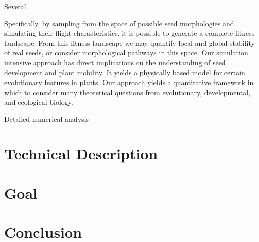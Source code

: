 \documentclass[annual]{acmsiggraph}
\begin{document}
Several 


Specifically, by sampling from the space of possible seed morphologies and simulating their flight characteristics, it is possible to generate a complete fitness landscape.  From this fitness landscape we may quantify local and global stability of real seeds, or consider morphological pathways in this space.  Our simulation intensive approach has direct implications on the understanding of seed development and plant mobility.  It yields a physically based model for certain evolutionary features in plants.   Our approach yields a quantitative framework in which to consider many theoretical questions from evolutionary, developmental, and ecological biology.  

Detailed numerical analysis 

\section{Technical Description}

\section{Goal}

\section{Conclusion}



\end{document}
